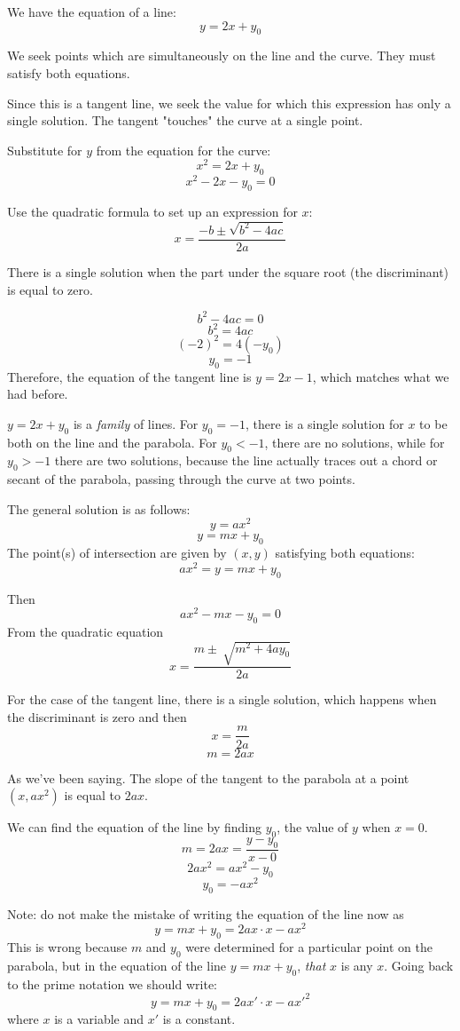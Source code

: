 \documentclass[11pt, oneside]{article}
\begin{document}
We have the equation of a line:
\[ y = 2x + y_0 \]

We seek points which are simultaneously on the line and the curve.  They must satisfy both equations.

Since this is a tangent line, we seek the value for which this expression has only a single solution.  The tangent "touches" the curve at a single point.

Substitute for $y$ from the equation for the curve:
\[ x^2 = 2x + y_0 \]
\[ x^2 - 2x - y_0 = 0 \]

Use the quadratic formula to set up an expression for $x$:
\[ x = \frac{-b \pm \sqrt{b^2 - 4ac}}{2a} \]

There is a single solution when the part under the square root (the discriminant) is equal to zero.

\[ b^2 - 4ac = 0 \]
\[ b^2 = 4ac \]
\[ (-2)^2 = 4(-y_0) \]
\[ y_0 = -1 \]
Therefore, the equation of the tangent line is $y = 2x - 1$, which matches what we had before.

$y = 2x + y_0$ is a \emph{family} of lines.  For $y_0 = -1$, there is a single solution for $x$ to be both on the line and the parabola.  For $y_0 < -1$, there are no solutions, while for $y_0 > -1$ there are two solutions, because the line actually traces out a chord or secant of the parabola, passing through the curve at two points.

The general solution is as follows:
\[ y = ax^2 \]
\[ y = mx + y_0 \]
The point(s) of intersection are given by $(x,y)$ satisfying both equations:
\[ ax^2 = y = mx + y_0 \]

Then
\[ ax^2 - mx - y_0 = 0 \]
From the quadratic equation
\[ x = \frac{m \pm \ \sqrt{m^2 + 4ay_0}}{2a} \]

For the case of the tangent line, there is a single solution, which happens when the discriminant is zero and then
\[ x = \frac{m}{2a} \]
\[ m = 2ax \]

As we've been saying.  The slope of the tangent to the parabola at a point $(x, ax^2)$ is equal to $2ax$.

We can find the equation of the line by finding $y_0$, the value of $y$ when $x = 0$.
\[ m = 2ax = \frac{y - y_0}{x - 0} \]
\[ 2ax^2 = ax^2 - y_0 \]
\[ y_0 = -ax^2 \]

Note:  do not make the mistake of writing the equation of the line now as
\[ y = mx + y_0 = 2ax \cdot x - ax^2 \]
This is wrong because $m$ and $y_0$ were determined for a particular point on the parabola, but in the equation of the line $y = mx + y_0$, \emph{that} $x$ is any $x$.  Going back to the prime notation we should write:
\[ y = mx + y_0 = 2ax' \cdot x - ax'^2 \]
where $x$ is a variable and $x'$ is a constant.
\end{document}
